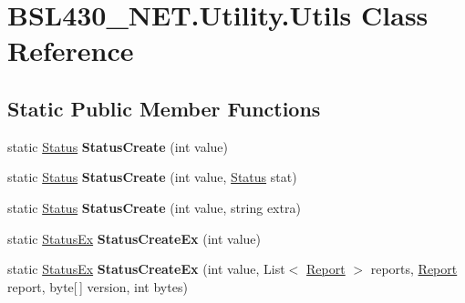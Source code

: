 \hypertarget{class_b_s_l430___n_e_t_1_1_utility_1_1_utils}{}\section{B\+S\+L430\+\_\+\+N\+E\+T.\+Utility.\+Utils Class Reference}
\label{class_b_s_l430___n_e_t_1_1_utility_1_1_utils}
\subsection*{Static Public Member Functions}
\begin{DoxyCompactItemize}
\item 
\mbox{\label{class_b_s_l430___n_e_t_1_1_utility_1_1_utils_ac4b0ce0bfb1c990980c8189b83e669dd}} 
static \mbox{\hyperlink{class_b_s_l430___n_e_t_1_1_status}{Status}} {\bfseries Status\+Create} (int value)
\item 
\mbox{\label{class_b_s_l430___n_e_t_1_1_utility_1_1_utils_a4b8c97fd46c4c11c575e2584765033e6}} 
static \mbox{\hyperlink{class_b_s_l430___n_e_t_1_1_status}{Status}} {\bfseries Status\+Create} (int value, \mbox{\hyperlink{class_b_s_l430___n_e_t_1_1_status}{Status}} stat)
\item 
\mbox{\label{class_b_s_l430___n_e_t_1_1_utility_1_1_utils_ad2ff11baf5749304a481e19e20d726b5}} 
static \mbox{\hyperlink{class_b_s_l430___n_e_t_1_1_status}{Status}} {\bfseries Status\+Create} (int value, string extra)
\item 
\mbox{\label{class_b_s_l430___n_e_t_1_1_utility_1_1_utils_a2e1a0dcfe578a994e2d5a1b9b632bda4}} 
static \mbox{\hyperlink{class_b_s_l430___n_e_t_1_1_status_ex}{Status\+Ex}} {\bfseries Status\+Create\+Ex} (int value)
\item 
\mbox{\label{class_b_s_l430___n_e_t_1_1_utility_1_1_utils_a74054add639b8064ca5fdb24fe29e4d2}} 
static \mbox{\hyperlink{class_b_s_l430___n_e_t_1_1_status_ex}{Status\+Ex}} {\bfseries Status\+Create\+Ex} (int value, List$<$ \mbox{\hyperlink{class_b_s_l430___n_e_t_1_1_report}{Report}} $>$ reports, \mbox{\hyperlink{class_b_s_l430___n_e_t_1_1_report}{Report}} report, byte\mbox{[}$\,$\mbox{]} version, int bytes)

\end{DoxyCompactItemize}
